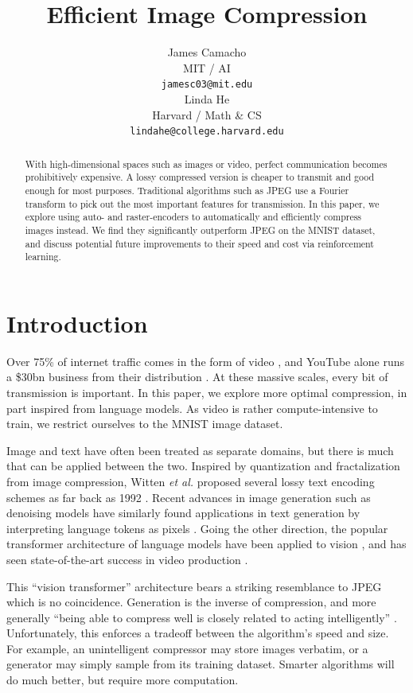 \documentclass[11pt]{article}
\title{Efficient Image Compression}
\author{James Camacho \\
  MIT / AI \\
  \texttt{jamesc03@mit.edu} \\\And
  Linda He \\
  Harvard / Math \& CS \\
  \texttt{lindahe@college.harvard.edu} \\}
\begin{document}
\maketitle
\begin{abstract}
  With high-dimensional spaces such as images or video, perfect communication becomes prohibitively expensive. A lossy compressed version is cheaper to transmit and good enough for most purposes. Traditional algorithms such as JPEG use a Fourier transform to pick out the most important features for transmission. In this paper, we explore using auto- and raster-encoders to automatically and efficiently compress images instead. We find they significantly outperform JPEG on the MNIST dataset, and discuss potential future improvements to their speed and cost via reinforcement learning.
\end{abstract}


\section{Introduction}

Over 75\% of internet traffic comes in the form of video \citep{cisco-2018-traffic}, and YouTube alone runs a \$30bn business from their distribution \citep{alphabet-2024-earnings}. At these massive scales, every bit of transmission is important. In this paper, we explore more optimal compression, in part inspired from language models. As video is rather compute-intensive to train, we restrict ourselves to the MNIST image dataset.

Image and text have often been treated as separate domains, but there is much that can be applied between the two. Inspired by quantization and fractalization from image compression, Witten \textit{et al.} proposed several lossy text encoding schemes as far back as 1992 \citep{witten-etal-1992-lossy}. Recent advances in image generation such as denoising models \citep{ho-2020-denoising} have similarly found applications in text generation by interpreting language tokens as pixels \citep{kou-2024-cllms}. Going the other direction, the popular transformer architecture of language models have been applied to vision \citep{dosovitskiy-2021-vit}, and has seen state-of-the-art success in video production \citep{liu-2024-sora}.

This ``vision transformer'' architecture bears a striking resemblance to JPEG which is no coincidence. Generation is the inverse of compression, and more generally ``being able to compress well is closely related to acting intelligently'' \citep{hutter-2020}. Unfortunately, this enforces a tradeoff between the algorithm's speed and size. For example, an unintelligent compressor may store images verbatim, or a generator may simply sample from its training dataset. Smarter algorithms will do much better, but require more computation.
\end{document}
